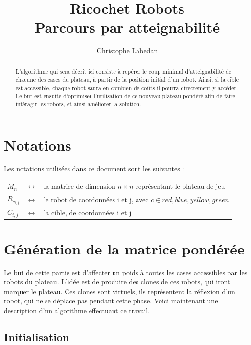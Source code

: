 \documentclass[a4paper,11pt]{article}
\author{Christophe Labedan}
\title{Ricochet Robots\\Parcours par atteignabilit\'e}
\date{}
\begin{document}
\maketitle
\vfill
\begin{abstract}
 L'algorithme qui sera d\'ecrit ici consiste \`a rep\'erer le coup minimal d'atteignabilit\'e de chacune des cases du plateau, \`a partir de la position initial d'un robot. Ainsi, si la cible est accessible, chaque robot saura en combien de co\^uts il pourra directement y acc\'eder. Le but est ensuite d'optimiser l'utilisation de ce nouveau plateau pond\'er\'e afin de faire int\'eragir les robots, et ainsi am\'eliorer la solution.
\end{abstract}
\vfill
\newpage

\section{Notations}
Les notations utilis\'ees dans ce document sont les suivantes :\\

\begin{tabular}{lcl}
$M_n$ & $\leftrightarrow$ & la matrice de dimension $n \times n$ repr\'esentant le plateau de jeu\\
$R_{c_{i,j}}$ & $\leftrightarrow$ & le robot de coordonn\'ees i  et j, avec $c \in {red, blue, yellow, green}$\\
$C_{i,j}$ & $\leftrightarrow$ & la cible, de coordonn\'ees i et j\\
\end{tabular}

\section{G\'en\'eration de la matrice pond\'er\'ee}
Le but de cette partie est d'affecter un poids \`a toutes les cases accessibles par les robots du plateau. L'id\'ee est de produire des clones de ces robots, qui iront marquer le plateau. Ces clones sont virtuels, ils repr\'esentent la r\'eflexion d'un robot, qui ne se d\'eplace pas pendant cette phase. Voici maintenant une description d'un algorithme effectuant ce travail.

\subsection{Initialisation}
\end{document}

